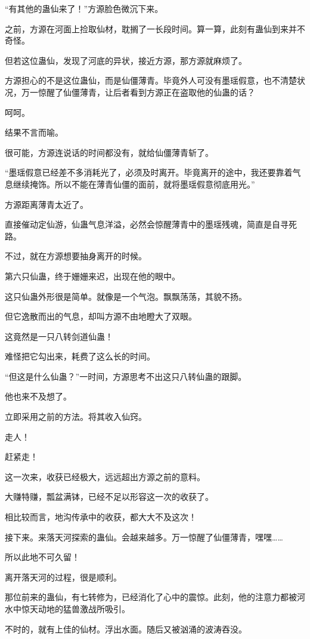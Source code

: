 \begin{this_body}
“有其他的蛊仙来了！”方源脸色微沉下来。

之前，方源在河面上捡取仙材，耽搁了一长段时间。算一算，此刻有蛊仙到来并不奇怪。

但若这位蛊仙，发现了河底的异状，接近方源，那方源就麻烦了。

方源担心的不是这位蛊仙，而是仙僵薄青。毕竟外人可没有墨瑶假意，也不清楚状况，万一惊醒了仙僵薄青，让后者看到方源正在盗取他的仙蛊的话？

呵呵。

结果不言而喻。

很可能，方源连说话的时间都没有，就给仙僵薄青斩了。

“墨瑶假意已经差不多消耗光了，必须及时离开。毕竟离开的途中，我还要靠着气息继续掩饰。所以不能在薄青仙僵的面前，就将墨瑶假意彻底用光。”

方源距离薄青太近了。

直接催动定仙游，仙蛊气息洋溢，必然会惊醒薄青中的墨瑶残魂，简直是自寻死路。

不过，就在方源想要抽身离开的时候。

第六只仙蛊，终于姗姗来迟，出现在他的眼中。

这只仙蛊外形很是简单。就像是一个气泡。飘飘荡荡，其貌不扬。

但它逸散而出的气息，却叫方源不由地瞪大了双眼。

这竟然是一只八转剑道仙蛊！

难怪把它勾出来，耗费了这么长的时间。

“但这是什么仙蛊？”一时间，方源思考不出这只八转仙蛊的跟脚。

他也来不及想了。

立即采用之前的方法。将其收入仙窍。

走人！

赶紧走！

这一次来，收获已经极大，远远超出方源之前的意料。

大赚特赚，瓢盆满钵，已经不足以形容这一次的收获了。

相比较而言，地沟传承中的收获，都大大不及这次！

接下来。来落天河探索的蛊仙。会越来越多。万一惊醒了仙僵薄青，嘿嘿……

所以此地不可久留！

离开落天河的过程，很是顺利。

那位前来的蛊仙，有七转修为，已经消化了心中的震惊。此刻，他的注意力都被河水中惊天动地的猛兽激战所吸引。

不时的，就有上佳的仙材。浮出水面。随后又被汹涌的波涛吞没。


\end{this_body}
